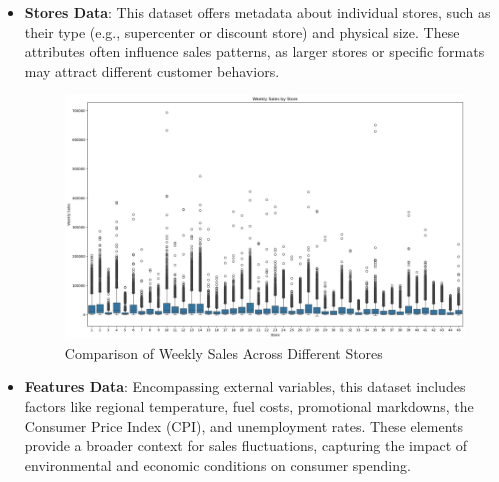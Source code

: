 \begin{itemize}
    \item \textbf{Stores Data}: This dataset offers metadata about individual stores, such as their type (e.g., supercenter or discount store) and physical size. These attributes often influence sales patterns, as larger stores or specific formats may attract different customer behaviors.
    \begin{figure}[h]
        \centering
        \includegraphics[width=0.8\linewidth]{./figures_adarsh/Weekly_Sale_by_Store.png}
        \caption{Comparison of Weekly Sales Across Different Stores}
        \label{fig:sales_by_store}
    \end{figure}
    
    \item \textbf{Features Data}: Encompassing external variables, this dataset includes factors like regional temperature, fuel costs, promotional markdowns, the Consumer Price Index (CPI), and unemployment rates. These elements provide a broader context for sales fluctuations, capturing the impact of environmental and economic conditions on consumer spending.
\end{itemize}

